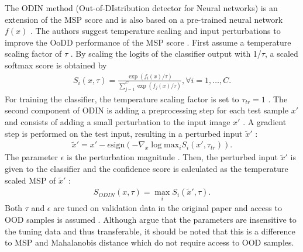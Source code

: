 \par
The ODIN method (Out-of-DIstribution detector for Neural networks) is an extension of the MSP score and is also based on a pre-trained neural network $f(x)$ \citep{Liang2018}.
The authors suggest temperature scaling and input perturbations to improve the OoDD performance of the MSP score \citep{Liang2018}.
First assume a temperature scaling factor of $\tau$ \citep{Liang2018}.
By scaling the logits of the classifier output with 1/$\tau$, a scaled softmax score is obtained by \citep{Liang2018}
\begin{align}
	S_i(x,\tau) = \frac{\exp(f_i(x)/\tau)}{\sum_{j=1}^{C}\exp(f_j(x)/\tau)}, \forall i=1,\dots,C.
\end{align}
For training the classifier, the temperature scaling factor is set to $\tau_{tr}=1$ \citep{Liang2018}.
The second component of ODIN is adding a preprocessing step for each test sample $x'$ and consists of adding a small perturbation to the input image $x'$ \citep{Liang2018}.
A gradient step is performed on the test input, resulting in a perturbed input $\tilde{x}'$ \citep{Liang2018}: 
\begin{align}
	\tilde{x}' = x' - \epsilon \text{sign}(-\nabla_x \log \text{max}_i  S_i(x',\tau_{tr})).
\end{align}
The parameter $\epsilon$ is the perturbation magnitude \citep{Liang2018}.
Then, the perturbed input $\tilde{x}'$ is given to the classifier and the confidence score is calculated as the temperature scaled MSP of $\tilde{x}'$ \citep{Liang2018}:
\begin{align}
	S_{ODIN}(x,\tau) = \max_i S_i(\tilde{x}',\tau).
\end{align}
Both $\tau$ and $\epsilon$ are tuned on validation data in the original paper and access to OOD samples is assumed \citep{Liang2018,Hsu2020}.
Although \citep{Liang2018} argue that the parameters are insensitive to the tuning data and thus transferable, it should be noted that this is a difference to MSP and Mahalanobis distance which do not require access to OOD samples.
